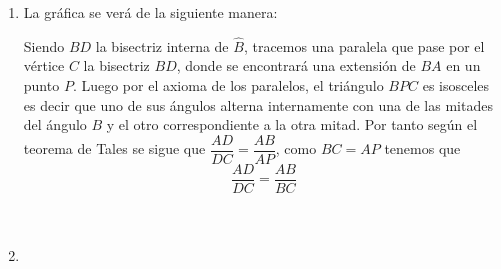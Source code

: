 \documentclass[10pt]{article}
\begin{document}
\begin{enumerate}
\item La gráfica se verá de la siguiente manera:\\
\begin{center}
\end{center}
Siendo $BD$ la bisectriz interna de $\widehat{B}$, tracemos una paralela que pase por el vértice $C$ la bisectriz $BD$, donde se encontrará una extensión de $BA$ en un punto $P$. Luego por el axioma de los paralelos, el triángulo $BPC$ es isosceles es decir que uno de sus ángulos alterna internamente con una de las mitades del ángulo $B$ y el otro correspondiente a la otra mitad. Por tanto según el teorema de Tales se sigue que $\dfrac{AD}{DC}=\dfrac{AB}{AP}$, como $BC=AP$ tenemos que $$\dfrac{AD}{DC}=\dfrac{AB}{BC}$$\\\\


\item 

\end{enumerate}
\end{document}
